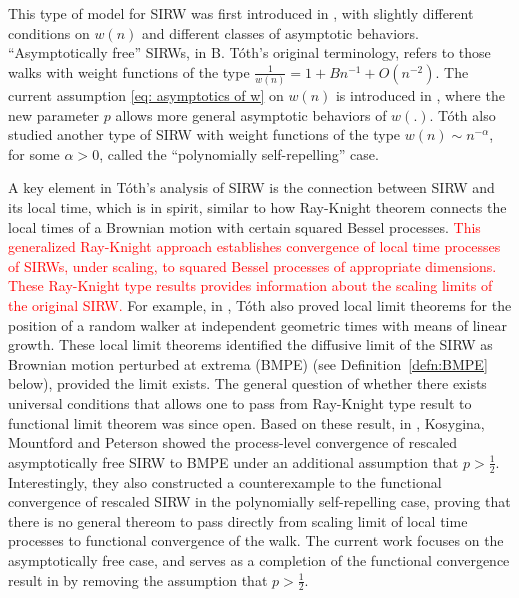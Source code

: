 \documentclass[twoside,12pt, a4paper]{article}
\numberwithin{equation}{section}
\theoremstyle{remark}
\newcommand\TBD{\textcolor{red}{TBD.}}
\newcommand{\edt}[1]{\textcolor{red}{#1}} %
\newcommand{\comment}[1]{\textcolor{blue}{(Comment: #1)}}
\begin{document}

	This type of model for SIRW was first introduced in \cite{T96}, with slightly different conditions on $w(n)$ and different classes of asymptotic behaviors. ``Asymptotically free'' SIRWs, in B. T\'oth's original terminology, refers to those walks with weight functions of the type $\frac{1}{w(n)} = 1 + B n^{-1} + O(n^{-2})$. 
	The current assumption \eqref{eq: asymptotics of w} on $w(n)$ is introduced in \cite{KMP23}, where the new parameter $p$ allows more general asymptotic behaviors of $w(.)$. 
	T\'oth also studied another type of SIRW with weight functions of the type $w(n)\sim n^{-\alpha}$, for some $\alpha >0$, called the ``polynomially self-repelling'' case. 

	A key element in T\'oth's analysis of SIRW is the connection between SIRW and its local time, which is in spirit, similar to how Ray-Knight theorem connects the local times of a Brownian motion with certain squared Bessel processes. 
	\edt{
This generalized Ray-Knight approach establishes convergence of local time processes of SIRWs, under scaling, to squared Bessel processes of appropriate dimensions. These Ray-Knight type results provides information about the scaling limits of the original SIRW.}
For example, in \cite{T96}, T\'oth also proved local limit theorems for the position of a random walker at independent geometric times with means of linear growth. 
	These local limit theorems identified the diffusive limit of the SIRW as Brownian motion perturbed at extrema (BMPE) (see Definition~\ref{defn:BMPE} below), provided the limit exists. 
	The general question of whether there exists universal conditions that allows one to pass from Ray-Knight type result to functional limit theorem was since open.
	Based on these result, in \cite{KMP23}, Kosygina, Mountford and Peterson showed the process-level convergence of rescaled asymptotically free SIRW to BMPE under an additional assumption that $p > \frac{1}{2}$. Interestingly, they also constructed a counterexample to the functional convergence of rescaled SIRW in the polynomially self-repelling case, proving that there is no general thereom to pass directly from scaling limit of local time processes to functional convergence of the walk. 
	The current work focuses on the asymptotically free case, and serves as a completion of the functional convergence result in \cite{KMP23} by removing the assumption that $p > \frac{1}{2}$.
	
\end{document}
